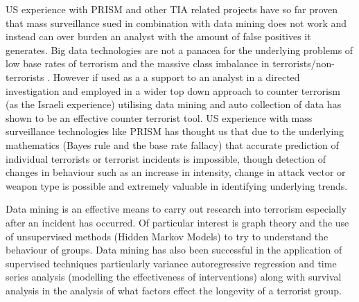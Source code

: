 US experience with PRISM and other TIA related projects have so far proven that mass
surveillance sued in combination with data mining does not work and instead can over burden an analyst with the amount of false positives it generates. Big data technologies are not a panacea for the underlying problems  of low base rates of terrorism and the massive class imbalance in terrorists/non-terrorists \citep{Masssurvelilancefail2015}. However if used as a a support to an analyst in a directed investigation and employed in a wider top down approach to counter terrorism (as the Israeli experience) utilising data mining and auto collection of data has shown to be an effective counter terrorist tool. US experience with mass surveillance technologies like PRISM has thought us that due to the underlying mathematics (Bayes rule and the base rate fallacy) \citep{schneier2015data} that accurate prediction of individual terrorists or terrorist incidents is impossible, though detection of changes in behaviour such as an increase in intensity, change in attack vector or weapon type is possible and extremely valuable in identifying underlying trends. 

Data mining is an effective means to carry out research into terrorism especially after an incident has occurred. Of particular interest is graph theory and the use of unsupervised methods (Hidden Markov Models) to try to understand the behaviour of groups. Data mining has also been successful in the application of supervised techniques particularly variance autoregressive regression and time series analysis (modelling the effectiveness of interventions) along with survival analysis in the analysis of what factors effect the longevity of a terrorist group.  

 

